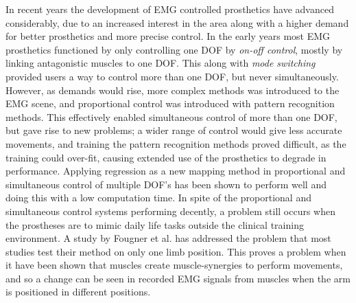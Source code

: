 In recent years the development of EMG controlled prosthetics have advanced considerably, due to an increased interest in the area along with a higher demand for better prosthetics and more precise control. \cite{Fougner2012} In the early years most EMG prosthetics functioned by only controlling one DOF by \textit{on-off control}, mostly by linking antagonistic muscles to one DOF. %
This along with \textit{mode switching} provided users a way to control more than one DOF, but never simultaneously. However, as demands would rise, more complex methods was introduced to the EMG scene, and proportional control was introduced with pattern recognition methods. This effectively enabled simultaneous control of more than one DOF, but gave rise to new problems; a wider range of control would give less accurate movements, and training the pattern recognition methods proved difficult, as the training could over-fit, causing extended use of the prosthetics to degrade in performance. \cite{Ison2016} 
Applying regression as a new mapping method in proportional and simultaneous control of multiple DOF's has been shown to perform well and doing this with a low computation time. \cite{hahne2014} In spite of the proportional and simultaneous control systems performing decently, a problem still occurs when the prostheses are to mimic daily life tasks outside the clinical training environment. \cite{jiang2012}
A study by Fougner et al. \cite{Fougner2011} has addressed the problem that most studies test their method on only one limb position.
This proves a problem when it have been shown that muscles create muscle-synergies to perform movements, and so a change can be seen in recorded EMG signals from muscles when the arm is positioned in different positions. \cite{Fougner2011, avella2006, DeRugy2013}
